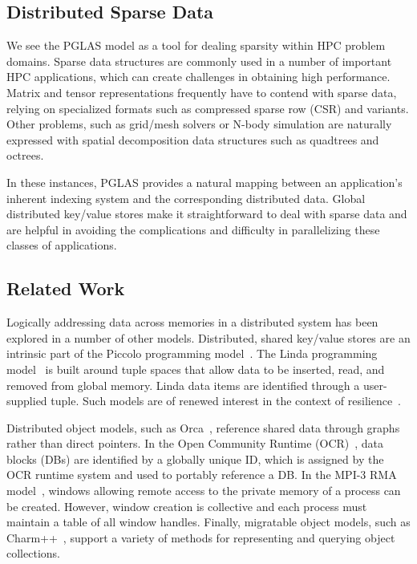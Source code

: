 \subsection{Distributed Sparse Data}

We see the PGLAS model as a tool for dealing sparsity within HPC problem domains.  
Sparse data structures are commonly used in a number of important HPC 
applications, which can create challenges in obtaining high performance. Matrix 
and tensor representations frequently have to contend with sparse data, 
relying on specialized formats such as compressed sparse row (CSR) and variants.  
Other problems, such as grid/mesh solvers or N-body simulation are naturally 
expressed with spatial decomposition data structures such as quadtrees and 
octrees. 

In these instances, PGLAS provides a natural mapping between an application's 
inherent indexing system and the corresponding distributed data. Global 
distributed key/value stores make it straightforward to deal with sparse data 
and are helpful in avoiding the complications and difficulty in parallelizing 
these classes of applications.

\subsection{Related Work} 

Logically addressing data across memories in a distributed
system has been explored in a number of other models.  Distributed,
shared key/value stores are an intrinsic part of the Piccolo
programming model~\cite{power:10}. The Linda programming
model~\cite{ahuja:86} is built around tuple spaces that allow data
to be inserted, read, and removed from global memory. Linda data items
are identified through a user-supplied tuple. Such models are of
renewed interest in the context of resilience~\cite{wilke:14}.

Distributed object models, such as Orca~\cite{bal:92}, reference
shared data through graphs rather than direct pointers.  In the Open
Community Runtime (OCR)~\cite{OCR}, data blocks (DBs) are identified
by a globally unique ID, which is assigned by the OCR runtime system
and used to portably reference a DB.  In the MPI-3 RMA 
model~\cite{mpi-forum:15}, windows allowing remote
access to the private memory of a process can be created.  However,
window creation is collective and each process must maintain a table of
all window handles.  Finally, migratable object
models, such as Charm++~\cite{kale:93}, support a variety of methods
for representing and querying object collections.


